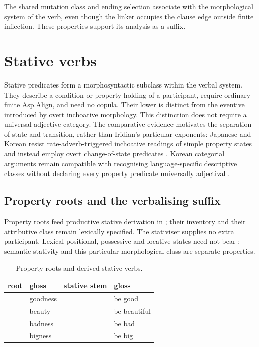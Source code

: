 \noindent The shared mutation class and ending selection associate
 with the morphological system of the verb, even though the linker
occupies the clause edge outside finite inflection. These properties support its
analysis as a suffix.


\section{Stative verbs}\label{sec:stative}

Stative predicates form a morphosyntactic subclass within the verbal system.
They describe a condition or property holding of a participant, require ordinary
finite Asp.Align, and need no copula. Their lower  is distinct
from the eventive  introduced by overt inchoative morphology.
This distinction does not require a universal adjective category. The comparative evidence motivates
the separation of state and transition, rather than Iridian's particular
exponents: Japanese and Korean resist rate-adverb-triggered inchoative
readings of simple property states and instead employ overt change-of-state
predicates
\cite{smithhopperdietzelkoontzgarboden2025}. Korean categorial arguments
remain compatible with recognising language-specific descriptive classes
without declaring every property predicate universally adjectival
\cite{kimaeryung2024}.

\subsection{Property roots and the verbalising suffix }

Property roots feed productive stative derivation in ; their
inventory and their attributive class remain lexically specified. The
stativiser supplies no extra participant. Lexical positional, possessive and
locative states need not bear : semantic stativity and this particular
morphological class are separate properties.

\begin{table}[ht]
\footnotesize
\caption{Property roots and derived stative verbs.}\label{tab:statroots}
\begin{tabularx}{\textwidth}{l L l L}
\toprule
{\sc root} & {\sc gloss} & {\sc stative stem} & {\sc gloss} \\
\midrule
{} & goodness &  & be good \\
 & beauty &  & be beautiful \\
 & badness &  & be bad \\
 & bigness &  & be big \\
\bottomrule
\end{tabularx}
\end{table}

